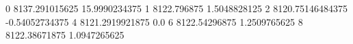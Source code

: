 0 8137.291015625 15.9990234375
1 8122.796875 1.5048828125
2 8120.75146484375 -0.54052734375
4 8121.2919921875 0.0
6 8122.54296875 1.2509765625
8 8122.38671875 1.0947265625

